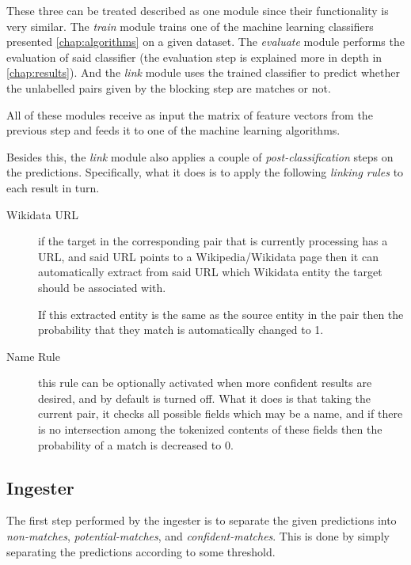 \documentclass[epsfig,a4paper,11pt,titlepage,twoside,openany]{book}
\begin{document}
These three can be treated described as one module since their functionality is very similar. The \textit{train} module trains one of the machine learning classifiers presented \autoref{chap:algorithms} on a given dataset. The \textit{evaluate} module performs the evaluation of said classifier (the evaluation step is explained more in depth in \autoref{chap:results}). And the \textit{link} module uses the trained classifier to predict whether the unlabelled pairs given by the blocking step are matches or not.

All of these modules receive as input the matrix of feature vectors from the previous step and feeds it to one of the machine learning algorithms.

Besides this, the \textit{link} module also applies a couple of \textit{post-classification} steps on the predictions. Specifically, what it does is to apply the following \textit{linking rules} to each result in turn.

\begin{description}
\item[Wikidata URL] if the target in the corresponding pair that is currently processing has a URL, and said URL points to a Wikipedia/Wikidata page then it can automatically extract from said URL which Wikidata entity the target should be associated with. 

If this extracted entity is the same as the source entity in the pair then the probability that they match is automatically changed to 1. 

\item[Name Rule] this rule can be optionally activated when more confident results are desired, and by default is turned off. What it does is that taking the current pair, it checks all possible fields which may be a name, and if there is no intersection among the tokenized contents of these fields then the probability of a match is decreased to 0.
\end{description}



\subsection{Ingester}
\label{sec:soweego-st-ingester}

The first step performed by the ingester is to separate the given predictions into \textit{non-matches}, \textit{potential-matches}, and \textit{confident-matches}. This is done by simply separating the predictions according to some threshold. 
\end{document}
